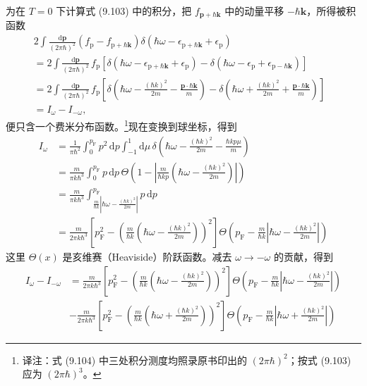 为在 $T=0$ 下计算式 (9.103) 中的积分，把 $f_{\mathbf{p}+\hbar\mathbf{k}}$ 中的动量平移 $-\hbar\mathbf{k}$，所得被积函数
\begin{equation*}
\begin{aligned}
2\int\frac{\mathrm{d}\mathbf{p}}{(2\pi\hbar)^2}\left(f_{\mathrm{p}}-f_{\mathrm{p}+\hbar\mathbf{k}}\right)\delta(\hbar\omega-\epsilon_{\mathrm{p}+\hbar\mathbf{k}}+\epsilon_{\mathrm{p}})&\\
=2\int\frac{\mathrm{d}\mathbf{p}}{(2\pi\hbar)^2}\,f_{\mathrm{p}}\left[\delta(\hbar\omega-\epsilon_{\mathrm{p}+\hbar\mathbf{k}}+\epsilon_{\mathrm{p}})-\delta(\hbar\omega-\epsilon_{\mathrm{p}}+\epsilon_{\mathrm{p}-\hbar\mathbf{k}})\right]&\\
=2\int\frac{\mathrm{d}\mathbf{p}}{(2\pi\hbar)^2}\,f_{\mathrm{p}}\left[\delta\left(\hbar\omega-\frac{(\hbar k)^2}{2m}-\frac{\mathbf{p}\cdot\hbar\mathbf{k}}{m}\right)-\delta\left(\hbar\omega+\frac{(\hbar k)^2}{2m}+\frac{\mathbf{p}\cdot\hbar\mathbf{k}}{m}\right)\right]&\\
=I_{\omega}-I_{-\omega},&
\end{aligned}\tag{9.104}
\end{equation*}
便只含一个费米分布函数。\footnote{译注：式 (9.104) 中三处积分测度均照录原书印出的 $(2\pi\hbar)^2$；按式 (9.103) 应为 $(2\pi\hbar)^3$。}现在变换到球坐标，得到
\begin{equation*}
\begin{aligned}
I_{\omega}&=\frac{1}{\pi\hbar^2}\int_{0}^{p_{\mathrm{F}}}p^2\,\mathrm{d}p\int_{-1}^{1}\mathrm{d}\mu\,\delta\left(\hbar\omega-\frac{(\hbar k)^2}{2m}-\frac{\hbar kp\mu}{m}\right)\\
&=\frac{m}{\pi k\hbar^3}\int_{0}^{p_{\mathrm{F}}}p\,\mathrm{d}p\,\Theta\left(1-\left|\frac{m}{\hbar kp}\left(\hbar\omega-\frac{(\hbar k)^2}{2m}\right)\right|\right)\\
&=\frac{m}{\pi k\hbar^3}\int_{\frac{m}{\hbar k}\left|\hbar\omega-\frac{(\hbar k)^2}{2m}\right|}^{p_{\mathrm{F}}}p\,\mathrm{d}p\\
&=\frac{m}{2\pi k\hbar^3}\left[p_{\mathrm{F}}^2-\left(\frac{m}{\hbar k}\left(\hbar\omega-\frac{(\hbar k)^2}{2m}\right)\right)^{\!2}\right]\Theta\left(p_{\mathrm{F}}-\frac{m}{\hbar k}\left|\hbar\omega-\frac{(\hbar k)^2}{2m}\right|\right)
\end{aligned}\tag{9.105}
\end{equation*}
这里 $\Theta(x)$ 是亥维赛（Heaviside）阶跃函数。减去 $\omega\to-\omega$ 的贡献，得到
\begin{equation*}
\begin{aligned}
I_{\omega}-I_{-\omega}&=\frac{m}{2\pi k\hbar^3}\left[p_{\mathrm{F}}^2-\left(\frac{m}{\hbar k}\left(\hbar\omega-\frac{(\hbar k)^2}{2m}\right)\right)^{\!2}\right]\Theta\left(p_{\mathrm{F}}-\frac{m}{\hbar k}\left|\hbar\omega-\frac{(\hbar k)^2}{2m}\right|\right)\\
&-\frac{m}{2\pi k\hbar^3}\left[p_{\mathrm{F}}^2-\left(\frac{m}{\hbar k}\left(\hbar\omega+\frac{(\hbar k)^2}{2m}\right)\right)^{\!2}\right]\Theta\left(p_{\mathrm{F}}-\frac{m}{\hbar k}\left|\hbar\omega+\frac{(\hbar k)^2}{2m}\right|\right)
\end{aligned}\tag{9.106}
\end{equation*}
